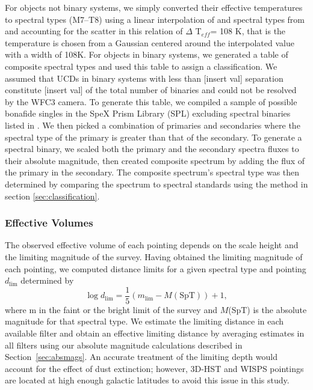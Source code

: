 \documentclass[manuscript]{aastex63}
\begin{document}
For objects not binary systems, we simply converted  their effective temperatures to spectral types (M7--T8) using a linear interpolation of \teff and spectral types from \cite{Pecaut2013} and accounting for the scatter in this relation of $\Delta$ T$_{eff}$= 108 K, that is the temperature is chosen from a Gaussian centered around the interpolated value with a width of 108K. For objects in binary systems, we generated a table of composite spectral types and used this table to assign a classification. We assumed that UCDs in binary systems with less than [insert val] separation constitute [insert val] of the total number of binaries and could not be resolved by the WFC3 camera. To generate this table, we compiled a sample of possible bonafide singles in the SpeX Prism Library (SPL) excluding spectral binaries listed in \cite{2019arXiv190604166B}. We then picked a combination of primaries and secondaries where the spectral type of the primary is greater than that of the secondary. To generate a spectral binary, we scaled both the primary and the secondary spectra fluxes to their absolute magnitude, then created composite spectrum by adding the flux of the primary in the secondary. The composite spectrum's spectral type was then determined by comparing the spectrum to spectral standards using the method in section \ref{sec:classification}. 

\subsubsection{Effective Volumes}
The observed effective volume of each pointing depends on the scale height and the limiting magnitude of the survey. Having obtained the limiting magnitude of each pointing, we computed distance limits for a given spectral type and pointing $d_{\text{lim}}$ determined by 
\begin{equation} 
\log d_{\text{lim}} =\frac{1}{5}(m_{\text{lim}}-M(\text{SpT}))+1, 
\end{equation}
where m in the faint or the bright limit of the survey and $M$(SpT) is the absolute magnitude for that spectral type. We estimate the limiting distance in each available filter and obtain an effective limiting distance by averaging estimates in all filters using our absolute magnitude calculations described in Section~\ref{sec:absmags}. An accurate treatment of the limiting depth would account for the effect of dust extinction; however, 3D-HST and WISPS pointings are located at high enough galactic latitudes to avoid this issue in this study.
\end{document}
